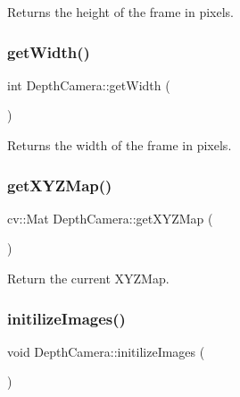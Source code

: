 Returns the height of the frame in pixels. 

\hypertarget{class_depth_camera_a59fa917e64c6c67248787ba2cba3654b}{}\label{class_depth_camera_a59fa917e64c6c67248787ba2cba3654b} 
\subsubsection{\texorpdfstring{get\+Width()}{getWidth()}}
{\footnotesize\ttfamily int Depth\+Camera\+::get\+Width (\begin{DoxyParamCaption}{ }\end{DoxyParamCaption})}



Returns the width of the frame in pixels. 

\hypertarget{class_depth_camera_a0c295c5a0696550f453b1c8cd0fcb188}{}\label{class_depth_camera_a0c295c5a0696550f453b1c8cd0fcb188} 
\subsubsection{\texorpdfstring{get\+X\+Y\+Z\+Map()}{getXYZMap()}}
{\footnotesize\ttfamily cv\+::\+Mat Depth\+Camera\+::get\+X\+Y\+Z\+Map (\begin{DoxyParamCaption}{ }\end{DoxyParamCaption})}



Return the current X\+Y\+Z\+Map. 

\hypertarget{class_depth_camera_a02f2fbde7cf4a340ace92278c89c66ef}{}\label{class_depth_camera_a02f2fbde7cf4a340ace92278c89c66ef} 
\subsubsection{\texorpdfstring{initilize\+Images()}{initilizeImages()}}
{\footnotesize\ttfamily void Depth\+Camera\+::initilize\+Images (\begin{DoxyParamCaption}{ }\end{DoxyParamCaption})\hspace{0.3cm}{\ttfamily [protected]}}



